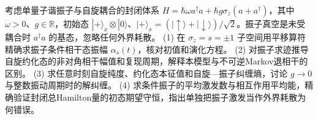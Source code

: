 考虑单量子谐振子与自旋耦合的封闭体系
\(H=\hbar\omega a^\dagger a+\hbar g\sigma_z(a+a^\dagger)\)，其中 \(\omega>0\)、\(g\in\mathbb R\)，初始态 \(|+\rangle_x\otimes|0\rangle\)、\(|+\rangle_x=(|\uparrow\rangle+|\downarrow\rangle)/\sqrt2\)。振子真空是未受耦合时 \(a^\dagger a\) 的基态，忽略任何外界耗散。
(1) 在 \(\sigma_z=s=\pm1\) 子空间用平移算符精确求振子条件相干态振幅 \(\alpha_s(t)\)，核对初值和演化方程。
(2) 对振子求迹推导自旋约化态的非对角相干幅值和复现周期，解释本模型与不可逆Markov退相干的区别。
(3) 求任意时刻自旋纯度、约化态本征值和自旋—振子纠缠熵，讨论 \(g\to0\) 与整数振动周期时的解纠缠。
(4) 求条件振子的平均激发数与相互作用平均能，精确验证封闭总Hamilton量的初态期望守恒，指出单独把振子激发当作外界耗散为何错误。
